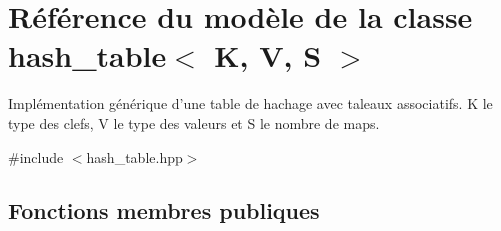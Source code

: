 \hypertarget{classhash__table}{\section{Référence du modèle de la classe hash\-\_\-table$<$ K, V, S $>$}
\label{classhash__table}
}


Implémentation générique d'une table de hachage avec taleaux associatifs. K le type des clefs, V le type des valeurs et S le nombre de maps.  




{\ttfamily \#include $<$hash\-\_\-table.\-hpp$>$}

\subsection*{Fonctions membres publiques}
